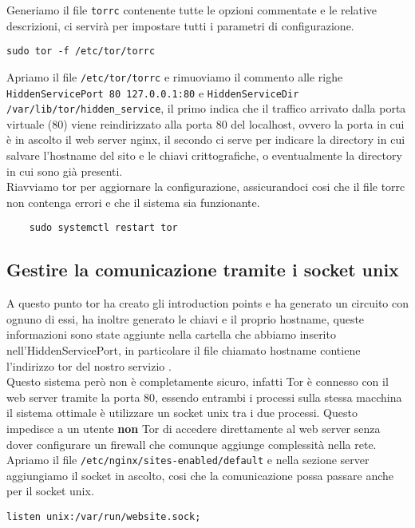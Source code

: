 \cite{TorRepo}

Generiamo il file \lstinline{torrc} contenente tutte le opzioni commentate e le relative descrizioni, ci servirà per impostare tutti i parametri di configurazione. 
\begin{lstlisting}[caption={Generazione file torrc}]
    sudo tor -f /etc/tor/torrc
\end{lstlisting}

Apriamo il file \lstinline{/etc/tor/torrc} e rimuoviamo il commento alle righe \lstinline{HiddenServicePort 80 127.0.0.1:80} e \lstinline{HiddenServiceDir /var/lib/tor/hidden_service}, il primo indica che il traffico arrivato dalla porta virtuale (80) viene reindirizzato alla porta 80 del localhost, ovvero la porta in cui è in ascolto il web server nginx, il secondo ci serve per indicare la directory in cui salvare l'hostname del sito e le chiavi crittografiche, o eventualmente la directory in cui sono già presenti. \\

Riavviamo tor per aggiornare la configurazione, assicurandoci cosi che il file torrc non contenga errori e che il sistema sia funzionante.
\begin{lstlisting}
    sudo systemctl restart tor
\end{lstlisting}

\subsection{Gestire la comunicazione tramite i socket unix}
A questo punto tor ha creato gli introduction points e ha generato un circuito con ognuno di essi, ha inoltre generato le chiavi e il proprio hostname, queste informazioni sono state aggiunte nella cartella che abbiamo inserito nell'HiddenServicePort, in particolare il file chiamato hostname contiene l'indirizzo tor del nostro servizio \cite{SetupOnionService}. \\
Questo sistema però non è completamente sicuro, infatti Tor è connesso con il web server tramite la porta 80, essendo entrambi i processi sulla stessa macchina il sistema ottimale è utilizzare un socket unix tra i due processi. 
Questo impedisce a un utente \textbf{non} Tor di accedere direttamente al web server senza dover configurare un firewall che comunque aggiunge complessità nella rete. \\
Apriamo il file \lstinline{/etc/nginx/sites-enabled/default} e nella sezione server aggiungiamo il socket in ascolto, cosi che la comunicazione possa passare anche per il socket unix.
\begin{lstlisting}[caption={Aggiunta/creazione socket unix}]
    listen unix:/var/run/website.sock;
\end{lstlisting}

